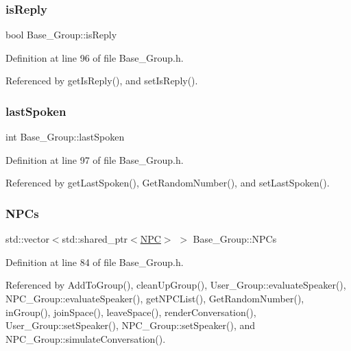 \subsubsection{\texorpdfstring{is\+Reply}{isReply}}
{\footnotesize\ttfamily bool Base\+\_\+\+Group\+::is\+Reply\hspace{0.3cm}{\ttfamily [private]}}



Definition at line 96 of file Base\+\_\+\+Group.\+h.



Referenced by get\+Is\+Reply(), and set\+Is\+Reply().

\mbox{\label{class_base___group_aa031e7ea2c490eae2e8101fb4093da00}} 
\subsubsection{\texorpdfstring{last\+Spoken}{lastSpoken}}
{\footnotesize\ttfamily int Base\+\_\+\+Group\+::last\+Spoken\hspace{0.3cm}{\ttfamily [private]}}



Definition at line 97 of file Base\+\_\+\+Group.\+h.



Referenced by get\+Last\+Spoken(), Get\+Random\+Number(), and set\+Last\+Spoken().

\mbox{\label{class_base___group_a4757f3c06c73eea029f71b871c1d863e}} 
\subsubsection{\texorpdfstring{N\+P\+Cs}{NPCs}}
{\footnotesize\ttfamily std\+::vector$<$std\+::shared\+\_\+ptr$<$\hyperlink{class_n_p_c}{N\+PC}$>$ $>$ Base\+\_\+\+Group\+::\+N\+P\+Cs\hspace{0.3cm}{\ttfamily [private]}}



Definition at line 84 of file Base\+\_\+\+Group.\+h.



Referenced by Add\+To\+Group(), clean\+Up\+Group(), User\+\_\+\+Group\+::evaluate\+Speaker(), N\+P\+C\+\_\+\+Group\+::evaluate\+Speaker(), get\+N\+P\+C\+List(), Get\+Random\+Number(), in\+Group(), join\+Space(), leave\+Space(), render\+Conversation(), User\+\_\+\+Group\+::set\+Speaker(), N\+P\+C\+\_\+\+Group\+::set\+Speaker(), and N\+P\+C\+\_\+\+Group\+::simulate\+Conversation().

